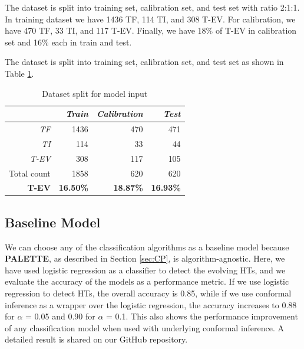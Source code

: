The dataset is split into training set, calibration set, and test set with ratio 2:1:1. In training dataset we have 1436 TF, 114 TI, and 308 T-EV. For calibration, we have 470 TF, 33 TI, and 117 T-EV. Finally, we have 18\% of T-EV in calibration set and 16\% each in train and test. 


The dataset is split into training set, calibration set, and test set as shown in Table \ref{tab:dataset}. 


\begin{table}[ht]
\centering
\caption{Dataset split for model input}
\begin{tabular}{rrrr}
\hline
\multicolumn{1}{l}{\textit{\textbf{}}} & \textit{Train}   & \textit{Calibration} & \textit{Test}    \\ \hline
\textit{TF}                            & 1436             & 470                  & 471              \\ \hline
\textit{TI}                            & 114              & 33                   & 44               \\ \hline
\textit{T-EV}                          & 308              & 117                  & 105              \\ \hline
Total count                            & 1858    & 620      & 620     \\
\textbf{T-EV}                                   & \textbf{16.50\%} & \textbf{18.87\%}     & \textbf{16.93\%}
\end{tabular}
\label{tab:dataset}
\end{table}



\subsection*{Baseline Model}
\label{Sec:Base}
We can choose any of the classification algorithms as a baseline model because \textbf{PALETTE}, as described in Section \ref{sec:CP}, is algorithm-agnostic. Here, we have used logistic regression as a classifier to detect the evolving HTs, and we evaluate the accuracy of the models as a performance metric. If we use logistic regression to detect HTs, the overall accuracy is 0.85, while if we use conformal inference as a wrapper over the logistic regression, the accuracy increases to 0.88 for $\alpha$ = 0.05 and 0.90 for $\alpha$ = 0.1. This also shows the performance improvement of any classification model when used with underlying conformal inference. A detailed result is shared on our GitHub repository.

